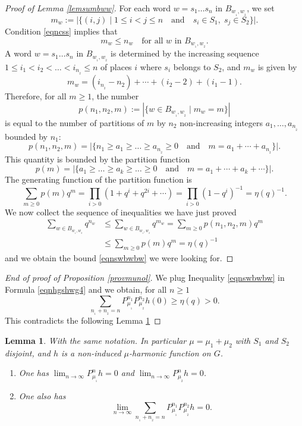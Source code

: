 \documentclass[11pt]{article}
\numberwithin{equation}{section}
\newenvironment{enumeratea}
{\bgroup\def\theenumi{\alph{enumi}}\begin{enumerate}}
{\end{enumerate}\egroup}
\newtheorem{Lem}[Thm]{Lemma}
\theoremstyle{definition}
\let\ra\to
\begin{document}
\begin{proof}[Proof of Lemma \ref{lemsumbww}]
For each word $w=s_1\ldots s_n$ in $B_{w_{_1}\!,w_{_2}}$, we set
\[
m_w:=\bigl|\{(i,j)\mid 1\leq i< j\leq n
\quad\text{and}\quad s_i\in S_1,\; s_j\in S_2\}\bigr|.
\]
Condition \eqref{eqncss} implies that
\[
m_w \leq n_w
\quad\text{for all $w$ in $B_{w_{_1}\!,w_{_2}}$}.
\]
A word $w=s_1\ldots s_n$ in $B_{w_{_1}\!,w_{_2}}$ is determined by the
increasing sequence $1\leq i_1<i_2<\ldots <i_{n_{_2}}\leq n$ of places $i$
where $s_i$ belongs to $S_2$, and $m_w$ is given by
\[
m_w=(i_{n_{_2}}\!-\!n_2)+\cdots +(i_2\!-\! 2)+(i_1\!-\! 1).
\]
Therefore, for all $m\geq 1$,
the number
\[
p(n_1,n_2,m):=|\{w \in B_{w_{_1},w_{_2}}\mid
m_w=m\}|
\]
is equal to the number of partitions of $m$
by $n_2$ non-increasing integers $a_1,\ldots,a_{n_{_2}}$ bounded by $n_1$:
\[
p(n_1,n_2,m)=\bigl|\{n_1\geq a_1\geq \ldots \geq a_{n_{_2}}\geq 0
\quad\text{and}\quad m=a_1+\cdots+a_{n_{_2}}\}\bigl|.
\]
This quantity is bounded by the partition function
\[
p(m)=\bigl|\{a_1\geq \ldots \geq a_k\geq \ldots\geq 0
\quad\text{and}\quad m=a_1+\cdots+a_k+\cdots\}\bigl|.
\]
The generating function of the partition function is
\[
\label{eqnspmqmp}
\sum_{m\geq 0}p(m)q^m
=
\prod\limits_{i> 0}(1+q^i+q^{2i}+\cdots)
= \prod\limits_{i> 0}(1-q^i)^{-1}
= \eta(q)^{-1}.
\]
We now collect the sequence of inequalities
we have just proved
\begin{align*}
\sum_{w\in B_{w_{_1}\!,w_{_2}}} q^{n_w}
&\leq
\sum_{w\in B_{w_{_1}\!,w_{_2}}} q^{m_w}
=
\sum_{m\geq 0} p(n_1,n_2,m)q^{m}\\
&\leq
\sum_{m\geq 0} p(m)q^{m}
=
\eta(q)^{-1}
\end{align*}
and we obtain the bound \eqref{eqnswbwbw} we were looking for.
\end{proof}

\begin{proof}[End of proof of Proposition \ref{provmunol}]
We plug Inequality \eqref{eqnswbwbw} in Formula \eqref{eqnhgshwg4}
and we obtain, for all $n\geq 1$
\begin{equation}
\label{eqnpmupmu}
\sum_{n_{_1}+n_{_2}=n}
P^{n_1}_{\mu_{_1}}P^{n_2}_{\mu_{_2}}h(0)\geq \eta(q)>0.
\end{equation}
This contradicts the following Lemma \ref{lempmupmu}
\end{proof}

\begin{Lem}\label{lempmupmu}
With the same notation. In particular $\mu=\mu_1+\mu_2$
with $S_1$ and $S_2$ disjoint,
and $h$ is a non-induced $\mu$-harmonic function on $G$.
\begin{enumeratea}
\item\label{lempmupmua}
One has
$\lim_{n\ra\infty}P^{n}_{\mu_{_1}}h =0$ and $\lim_{n\ra\infty}P^{n}_{\mu_{_2}}h = 0$.
\item\label{lempmupmub}
One also has
\begin{equation}
\label{eqnpmupmo}
\lim_{n\ra\infty}\sum_{n_{_1}+n_{_2}=n}
P^{n_1}_{\mu_{_1}}P^{n_2}_{\mu_{_2}}h=0.
\end{equation}
\end{enumeratea}
\end{Lem}
\end{document}
